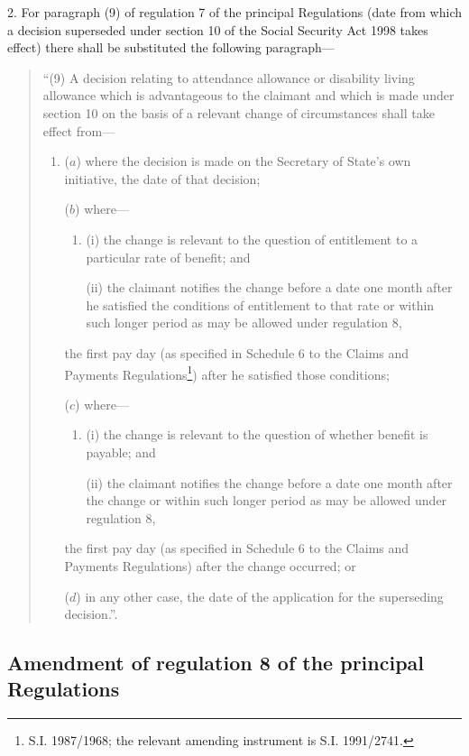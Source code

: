 \documentclass[12pt,a4paper]{article}
\begin{document}
2.  For paragraph (9) of regulation 7 of the principal Regulations (date from which a decision superseded under section 10 of the Social Security Act 1998 takes effect) there shall be substituted the following paragraph—
\begin{quotation}
“(9) A decision relating to attendance allowance or disability living allowance which is advantageous to the claimant and which is made under section 10 on the basis of a relevant change of circumstances shall take effect from—
\begin{enumerate}\item[]
($a$) where the decision is made on the Secretary of State’s own initiative, the date of that decision;

($b$) where—
\begin{enumerate}\item[]
(i) the change is relevant to the question of entitlement to a particular rate of benefit; and

(ii) the claimant notifies the change before a date one month after he satisfied the conditions of entitlement to that rate or within such longer period as may be allowed under regulation 8,
\end{enumerate}
the first pay day (as specified in Schedule 6 to the Claims and Payments Regulations\footnote{\frenchspacing S.I. 1987/1968; the relevant amending instrument is S.I. 1991/2741.}) after he satisfied those conditions;

($c$) where—
\begin{enumerate}\item[]
(i) the change is relevant to the question of whether benefit is payable; and

(ii) the claimant notifies the change before a date one month after the change or within such longer period as may be allowed under regulation 8,
\end{enumerate}
the first pay day (as specified in Schedule 6 to the Claims and Payments Regulations) after the change occurred; or

($d$) in any other case, the date of the application for the superseding decision.”.
\end{enumerate}
\end{quotation}

\subsection[3. Amendment of regulation 8 of the principal Regulations]{Amendment of regulation 8 of the principal Regulations}
\end{document}
